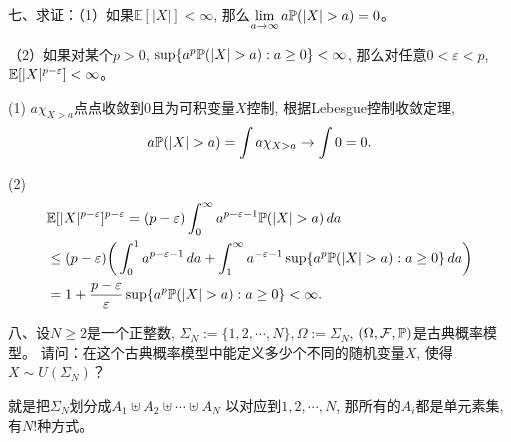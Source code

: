 七、求证：（1）如果$\mathbb{E}[|X|]<\infty$, 
那么$\lim\limits_{a\to \infty}a\p(|X|>a)=0$。

（2）如果对某个$p>0$, $\sup\{a^p\p(|X|>a):a\ge 0\}<\infty$, 
那么对任意$0<\varepsilon<p$, $\mathbb{E}[|X|^{p-\varepsilon}]<\infty$。
\begin{proofc}
(1) $a\chi_{X>a}$点点收敛到$0$且为可积变量$X$控制, 
根据Lebesgue控制收敛定理, \[a\p(|X|>a)=\int a\chi_{X>a}\to\int0=0.\]

(2) \begin{align*}
    &\e[|X|^{p-\varepsilon}]^{p-\varepsilon}
    =(p-\varepsilon)\int_0^\infty a^{p-\varepsilon-1}\p(|X|>a)\,da\\
    &\le(p-\varepsilon)\bigg(\int_0^1 a^{p-\varepsilon-1}\,da
    +\int_1^\infty a^{-\varepsilon-1}\sup\{a^p\p(|X|>a):a\ge 0\}\,da\bigg)\\
    &=1+\frac{p-\varepsilon}{\varepsilon}\sup\{a^p\p(|X|>a):a\ge 0\}<\infty.
\end{align*}
\end{proofc}

八、设$N\ge 2$是一个正整数, $\Sigma_{N}:=\{1,2,\cdots,N\},\Omega:=\Sigma_{N}$, 
$(\Omega,\mathcal{F},\mathbb{P})$是古典概率模型。
请问：在这个古典概率模型中能定义多少个不同的随机变量$X$, 使得$X\sim U(\Sigma_{N})$？
\begin{proofc}[解答]
    就是把$\Sigma_N$划分成$A_1\uplus A_2\uplus\cdots\uplus A_N$
    以对应到$1,2,\cdots,N$, 那所有的$A_i$都是单元素集, 有$N!$种方式。
\end{proofc}

